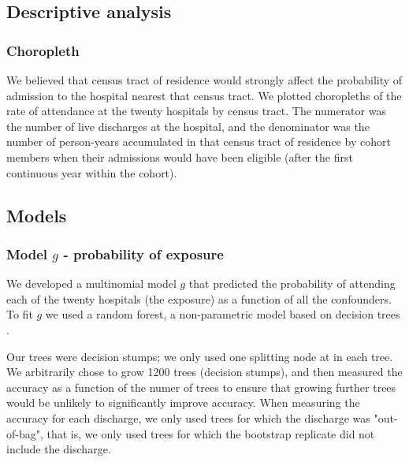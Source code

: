 \documentclass[]{article}\usepackage[]{graphicx}\usepackage[]{color}
\begin{document}
\subsection{Descriptive analysis}

\subsubsection{Choropleth}
We believed that census tract of residence would strongly affect the probability of admission to the hospital nearest that census tract. We plotted choropleths of the rate of attendance at the twenty hospitals by census tract. The numerator was the number of live discharges at the hospital, and the denominator was the number of person-years accumulated in that census tract of residence by cohort members when their admissions would have been eligible (after the first continuous year within the cohort).

\subsection{Models}
\subsubsection{Model $g$ - probability of exposure}
We developed a multinomial model $g$ that predicted the probability of attending each of the twenty hospitals (the exposure) as a function of all the confounders. To fit $g$ we used a random forest, a non-parametric model based on decision trees \cite{breiman_random_2001}. 

Our trees were decision stumps; we only used one splitting node at in each tree. We arbitrarily chose to grow 1200 trees (decision stumps), and then measured the accuracy as a function of the numer of trees to ensure that growing further trees would be unlikely to significantly improve accuracy. When measuring the accuracy for each discharge, we only used trees for which the discharge was "out-of-bag", that is, we only used trees for which the bootstrap replicate did not include the discharge.

 
\end{document}
